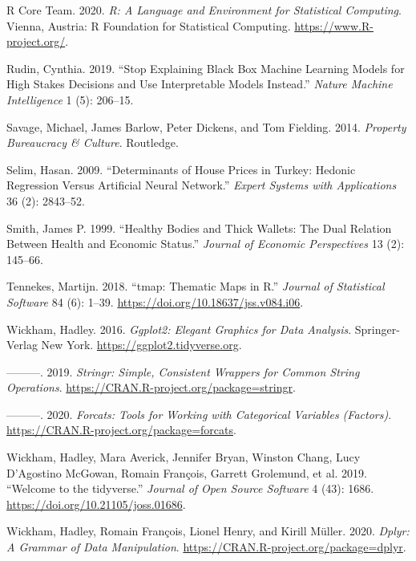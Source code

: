 \documentclass[conference,final,]{IEEEtran}
\newlength{\cslhangindent}
\newenvironment{cslreferences}%
  {\setlength{\parindent}{0pt}%
  \everypar{\setlength{\hangindent}{\cslhangindent}}\ignorespaces}%
  {\par}
\begin{document}
\begin{cslreferences}
\leavevmode\hypertarget{ref-R-base}{}%
R Core Team. 2020. \emph{R: A Language and Environment for Statistical Computing}. Vienna, Austria: R Foundation for Statistical Computing. \url{https://www.R-project.org/}.

\leavevmode\hypertarget{ref-rudin2019stop}{}%
Rudin, Cynthia. 2019. ``Stop Explaining Black Box Machine Learning Models for High Stakes Decisions and Use Interpretable Models Instead.'' \emph{Nature Machine Intelligence} 1 (5): 206--15.

\leavevmode\hypertarget{ref-savage2014property}{}%
Savage, Michael, James Barlow, Peter Dickens, and Tom Fielding. 2014. \emph{Property Bureaucracy \& Culture}. Routledge.

\leavevmode\hypertarget{ref-selim2009determinants}{}%
Selim, Hasan. 2009. ``Determinants of House Prices in Turkey: Hedonic Regression Versus Artificial Neural Network.'' \emph{Expert Systems with Applications} 36 (2): 2843--52.

\leavevmode\hypertarget{ref-smith1999healthy}{}%
Smith, James P. 1999. ``Healthy Bodies and Thick Wallets: The Dual Relation Between Health and Economic Status.'' \emph{Journal of Economic Perspectives} 13 (2): 145--66.

\leavevmode\hypertarget{ref-R-tmap}{}%
Tennekes, Martijn. 2018. ``tmap: Thematic Maps in R.'' \emph{Journal of Statistical Software} 84 (6): 1--39. \url{https://doi.org/10.18637/jss.v084.i06}.

\leavevmode\hypertarget{ref-R-ggplot2}{}%
Wickham, Hadley. 2016. \emph{Ggplot2: Elegant Graphics for Data Analysis}. Springer-Verlag New York. \url{https://ggplot2.tidyverse.org}.

\leavevmode\hypertarget{ref-R-stringr}{}%
---------. 2019. \emph{Stringr: Simple, Consistent Wrappers for Common String Operations}. \url{https://CRAN.R-project.org/package=stringr}.

\leavevmode\hypertarget{ref-R-forcats}{}%
---------. 2020. \emph{Forcats: Tools for Working with Categorical Variables (Factors)}. \url{https://CRAN.R-project.org/package=forcats}.

\leavevmode\hypertarget{ref-R-tidyverse}{}%
Wickham, Hadley, Mara Averick, Jennifer Bryan, Winston Chang, Lucy D'Agostino McGowan, Romain François, Garrett Grolemund, et al. 2019. ``Welcome to the tidyverse.'' \emph{Journal of Open Source Software} 4 (43): 1686. \url{https://doi.org/10.21105/joss.01686}.

\leavevmode\hypertarget{ref-R-dplyr}{}%
Wickham, Hadley, Romain François, Lionel Henry, and Kirill Müller. 2020. \emph{Dplyr: A Grammar of Data Manipulation}. \url{https://CRAN.R-project.org/package=dplyr}.


\end{cslreferences}
\end{document}
